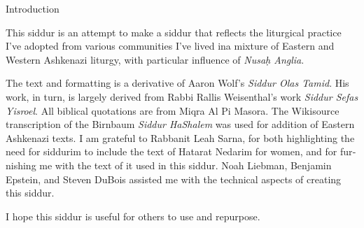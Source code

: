 \begin{minipage}{\textwidth}

\begin{english}
\begin{center} %
\begin{LARGE}
Introduction
\end{LARGE}
\end{center}

This siddur is an attempt to make a siddur that reflects the liturgical practice I've adopted from various communities I've lived in\textemdash a mixture of Eastern and Western Ashkenazi liturgy, with particular influence of \textit{Nusa\d{h} Anglia}.

The text and formatting is a derivative of Aaron Wolf's \textit{Siddur Olas Tamid}.  His work, in turn, is largely derived from Rabbi Rallis Weisenthal's work \textit{Siddur Sefas Yisroel}. All biblical quotations are from Miqra Al Pi Masora. The Wikisource transcription of the Birnbaum \textit{Siddur HaShalem} was used for addition of Eastern Ashkenazi texts. I am grateful to Rabbanit Leah Sarna, for both highlighting the need for siddurim to include the text of Hatarat Nedarim for women, and for furnishing me with the text of it used in this siddur.  Noah Liebman, Benjamin Epstein, and Steven DuBois assisted me with the technical aspects of creating this siddur.

I hope this siddur is useful for others to use and repurpose.

\end{english}

\end{minipage}

\renewcommand{\contentsname}{}
\tableofcontents
\mainmatter
\clearpage
{}


\vspace*{\fill}

\thispagestyle{empty}
\begin{Large}
\begin{center}
\end{center}
\end{Large}



\vspace*{\fill}


\centerlast


\renewcommand{\thefootnote}{\arabic{footnote}} %
\setlength{\parskip}{0.75em}

\newcommand{\halfline}{\vspace{0.5\baselineskip}}